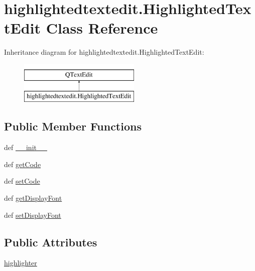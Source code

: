\hypertarget{classhighlightedtextedit_1_1HighlightedTextEdit}{}\section{highlightedtextedit.\+Highlighted\+Text\+Edit Class Reference}
\label{classhighlightedtextedit_1_1HighlightedTextEdit}
Inheritance diagram for highlightedtextedit.\+Highlighted\+Text\+Edit\+:\begin{figure}[H]
\begin{center}
\leavevmode
\includegraphics[height=2.000000cm]{classhighlightedtextedit_1_1HighlightedTextEdit}
\end{center}
\end{figure}
\subsection*{Public Member Functions}
\begin{DoxyCompactItemize}
\item 
def \hyperlink{classhighlightedtextedit_1_1HighlightedTextEdit_ab9a4045414ed2d69f33d5f8281786233}{\+\_\+\+\_\+init\+\_\+\+\_\+}
\item 
def \hyperlink{classhighlightedtextedit_1_1HighlightedTextEdit_a0fcb2fc6b1bf0b238af84fc1c9993dee}{get\+Code}
\item 
def \hyperlink{classhighlightedtextedit_1_1HighlightedTextEdit_ae0d7a380b420d75d6a7b8f1c78ba6388}{set\+Code}
\item 
def \hyperlink{classhighlightedtextedit_1_1HighlightedTextEdit_a00e855cdbc61b4358314a9079ba8d866}{get\+Display\+Font}
\item 
def \hyperlink{classhighlightedtextedit_1_1HighlightedTextEdit_a43d6d6657b7f2e2c03a010bc018566d6}{set\+Display\+Font}
\end{DoxyCompactItemize}
\subsection*{Public Attributes}
\begin{DoxyCompactItemize}
\item 
\hyperlink{classhighlightedtextedit_1_1HighlightedTextEdit_af353c0b684a95cd4eb35bcac4cb1ebbb}{highlighter}
\end{DoxyCompactItemize}
